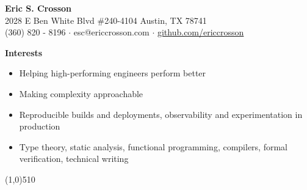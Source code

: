 \documentclass{report}
\newcommand{\cut}{\begin{center} \line(1,0){510} \end{center}}
\begin{document}
\pagestyle{empty}
\setlength\parindent{0pt}

\begin{center}
  \textbf{Eric S. Crosson} \\
  2028 E Ben White Blvd \#240-4104 Austin, TX 78741 \\
  (360) 820 - 8196 $\cdot$ esc@ericcrosson.com $\cdot$ \href{https://github.com/EricCrosson}{github.com/ericcrosson}
\end{center}

\textbf{Interests}
\begin{itemize}[label=$\cdot$]
\item Helping high-performing engineers perform better
\item Making complexity approachable
\item Reproducible builds and deployments, observability and experimentation in production
\item Type theory, static analysis, functional programming, compilers, formal verification, technical writing
\end{itemize}

\cut{}
\end{document}
